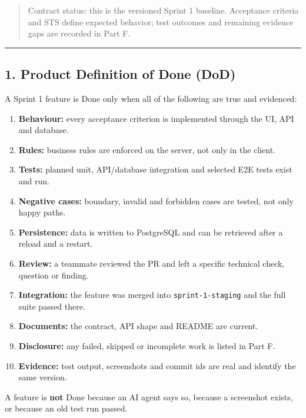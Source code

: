 \documentclass[12pt,a4paper]{article}
\begin{document}
\label{part-e-start}


\begin{quote}
Contract status: this is the versioned Sprint 1 baseline. Acceptance criteria and STS define expected behavior; test outcomes and remaining evidence gaps are recorded in Part F.

\end{quote}

\medskip\noindent\rule{\linewidth}{0.4pt}\medskip

\subsection*{1. Product Definition of Done (DoD)}
A Sprint 1 feature is Done only when all of the following are true and evidenced:

\begin{enumerate}[leftmargin=*]
\item \textbf{Behaviour:} every acceptance criterion is implemented through the UI, API and database.
\item \textbf{Rules:} business rules are enforced on the server, not only in the client.
\item \textbf{Tests:} planned unit, API/database integration and selected E2E tests exist and run.
\item \textbf{Negative cases:} boundary, invalid and forbidden cases are tested, not only happy paths.
\item \textbf{Persistence:} data is written to PostgreSQL and can be retrieved after a reload and a restart.
\item \textbf{Review:} a teammate reviewed the PR and left a specific technical check, question or finding.
\item \textbf{Integration:} the feature was merged into \texttt{sprint-1-staging} and the full suite passed there.
\item \textbf{Documents:} the contract, API shape and README are current.
\item \textbf{Disclosure:} any failed, skipped or incomplete work is listed in Part F.
\item \textbf{Evidence:} test output, screenshots and commit ids are real and identify the same version.
\end{enumerate}

A feature is \textbf{not} Done because an AI agent says so, because a screenshot exists, or because an old test run passed.
\end{document}
